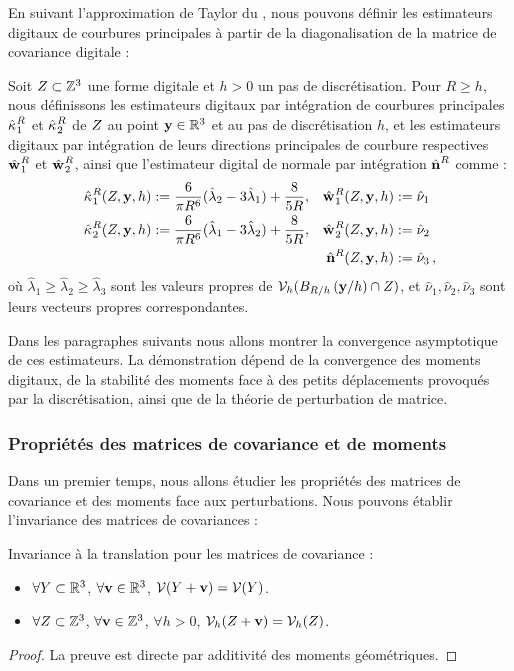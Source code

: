 %
En suivant l'approximation de Taylor du , nous pouvons
définir les estimateurs digitaux de courbures principales à partir de la
diagonalisation de la matrice de covariance digitale :
%
\begin{definition}
  \label{def:principal-curv-estimators}
%
  Soit $Z \subset \mathbb{Z}^3$ une forme digitale et $h > 0$ un pas de
  discrétisation. Pour $R \ge h$, nous définissons les estimateurs digitaux par
  intégration de courbures principales $\hat{\kappa_{}}_{1}^{R}$ et
  $\hat{\kappa_{}}_{2}^{R}$ de $Z$ au point $\mathbf{y} \in \mathbb{R}^3$ et au pas de
  discrétisation $h$, et les estimateurs digitaux par intégration de leurs
  directions principales de courbure respectives $\hat{\mathbf{w}_{}}_{1}^{R}$ et
  $\hat{\mathbf{w}_{}}_{2}^{R}$, ainsi que l'estimateur digital de normale par intégration
  $\hat{\mathbf{n}{}}^{R}$ comme :
%
\begin{align}
  \hat{\kappa_{}}_{1}^{R}(Z,\mathbf{y},h)  &:= \frac{6}{\pi R^6}(\hat{\lambda}_2 - 3\hat{\lambda}_1) + \frac{8}{5R},
  &\hat{\mathbf{w}_{}}_{1}^{R}(Z,\mathbf{y},h) &:= \hat{\nu}_1 \\
  \hat{\kappa_{}}_{2}^{R}(Z,\mathbf{y},h) &:= \frac{6}{\pi R^6}(\hat{\lambda}_1 - 3\hat{\lambda}_2) + \frac{8}{5R},
  &\hat{\mathbf{w}_{}}_{2}^{R}(Z,\mathbf{y},h) &:= \hat{\nu}_2\\
  & &\hat{\mathbf{n}{}}^{R}(Z,\mathbf{y},h) &:=\hat{\nu}_3\,,
\end{align}
%
où $\hat{\lambda}_1 \ge \hat{\lambda}_2 \ge \hat{\lambda}_3$ sont les valeurs
propres de $\mathcal{V}_{h}(B_{R/h}\left(\mathbf{y} / h\right) \cap Z)$, et $\hat{\nu}_1,
\hat{\nu}_2, \hat{\nu}_3$ sont leurs vecteurs propres correspondantes.
%
\end{definition}
%
Dans les paragraphes suivants nous allons montrer la convergence asymptotique de
ces estimateurs. La démonstration dépend de la convergence des moments digitaux,
de la stabilité des moments face à des petits déplacements provoqués par la
discrétisation, ainsi que de la théorie de perturbation de matrice.
%
\subsubsection{Propriétés des matrices de covariance et de moments}

Dans un premier temps, nous allons étudier les propriétés des matrices de
covariance et des moments face aux perturbations. Nous pouvons
établir l'invariance des matrices de covariances :
%
\begin{lemma} \label{lem:covariance-translation-invariant}
%
  Invariance à la translation pour les matrices de covariance :
%
  \begin{itemize}
    \item $\forall Y \subset \mathbb{R}^3$, $\forall \mathbf{v} \in \mathbb{R}^3$, $\mathcal{V}(Y + \mathbf{v}) = \mathcal{V}(Y)$.
    \item $\forall Z \subset \mathbb{Z}^3$, $\forall \mathbf{v} \in \mathbb{Z}^3$, $\forall h > 0$, $\mathcal{V}_{h}(Z + \mathbf{v}) = \mathcal{V}_{h}(Z)$.
  \end{itemize}
%
\end{lemma}
\begin{proof}
  La preuve est directe par additivité des moments géométriques.
\end{proof}

